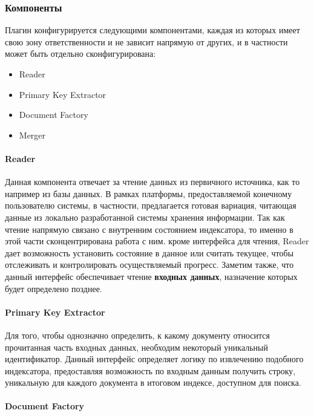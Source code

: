 \subsubsection{Компоненты}

Плагин конфигурируется следующими компонентами, каждая из которых имеет свою зону ответственности и не зависит напрямую от других, и в частности может быть отдельно сконфигурирована:

\begin{itemize}
	\item Reader
	\item Primary Key Extractor
	\item Document Factory
	\item Merger
\end{itemize}

\paragraph{Reader}

Данная компонента отвечает за чтение данных из первичного источника, как то например из базы данных. В рамках платформы, предоставляемой конечному пользователю системы, в частности, предлагается готовая вариация, читающая данные из локально разработанной системы хранения информации. Так как чтение напрямую связано с внутренним состоянием индексатора, то именно в этой части сконцентрирована работа с ним. кроме интерфейса для чтения, Reader дает возможность установить состояние в данное или считать текущее, чтобы отслеживать и контролировать осуществляемый прогресс. Заметим также, что данный интерфейс обеспечивает чтение \textbf{входных данных}, назначение которых будет определено позднее.

\paragraph{Primary Key Extractor}

Для того, чтобы однозначно определить, к какому документу относится прочитанная часть входных данных, необходим некоторый уникальный идентификатор. Данный интерфейс определяет логику по извлечению подобного индексатора, предоставляя возможность по входным данным получить строку, уникальную для каждого документа в итоговом индексе, доступном для поиска.

\paragraph{Document Factory}

